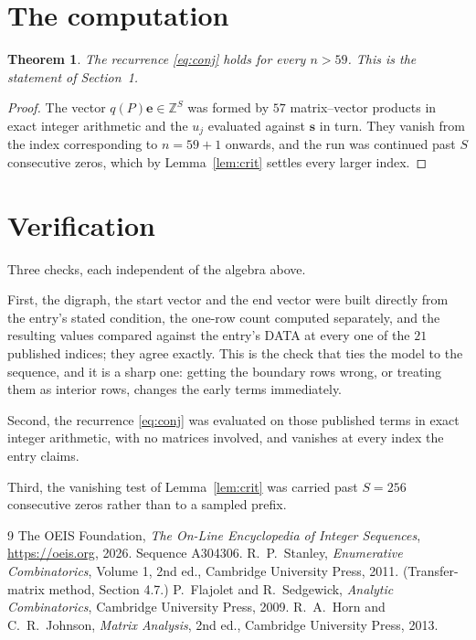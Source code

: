 \documentclass[11pt,a4paper]{article}
\theoremstyle{plain}
\newtheorem{theorem}{Theorem}
\theoremstyle{definition}
\begin{document}
\section{The computation}

\begin{theorem}
The recurrence \eqref{eq:conj} holds for every $n>59$. This is the statement of
Section~1.
\end{theorem}

\begin{proof}
The vector $q(P)\mathbf{e}\in\mathbb{Z}^{S}$ was formed by $57$ matrix--vector
products in exact integer arithmetic and the $u_j$ evaluated against $\mathbf{s}$ in turn.
They vanish from the index corresponding to $n=59+1$ onwards, and the run was continued
past $S$ consecutive zeros, which by Lemma~\ref{lem:crit} settles every larger index.
\end{proof}

\section{Verification}

Three checks, each independent of the algebra above.

First, the digraph, the start vector and the end vector were built directly from the
entry's stated condition, the one-row count computed separately, and the resulting values
compared against the entry's DATA at every one of the $21$ published indices; they
agree exactly. This is the check that ties the model to the sequence, and it is a sharp one:
getting the boundary rows wrong, or treating them as interior rows, changes the early terms
immediately.

Second, the recurrence \eqref{eq:conj} was evaluated on those published terms in exact
integer arithmetic, with no matrices involved, and vanishes at every index the entry claims.

Third, the vanishing test of Lemma~\ref{lem:crit} was carried past $S=256$ consecutive
zeros rather than to a sampled prefix.

\begin{thebibliography}{9}
 The OEIS Foundation, \emph{The On-Line Encyclopedia of Integer
Sequences}, \url{https://oeis.org}, 2026. Sequence A304306.
 R.~P.~Stanley, \emph{Enumerative Combinatorics}, Volume 1, 2nd ed.,
Cambridge University Press, 2011. (Transfer-matrix method, Section 4.7.)
 P.~Flajolet and R.~Sedgewick, \emph{Analytic Combinatorics}, Cambridge
University Press, 2009.
 R.~A.~Horn and C.~R.~Johnson, \emph{Matrix Analysis}, 2nd ed., Cambridge
University Press, 2013.
\end{thebibliography}
\end{document}
